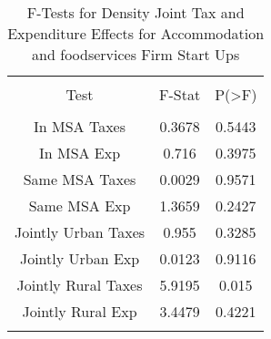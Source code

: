 
\begin{table}[!htbp] \centering 
  \caption{F-Tests for Density Joint Tax and Expenditure Effects for Accommodation and foodservices Firm Start Ups} 
  \label{72Ftests} 
\begin{tabular}{@{\extracolsep{5pt}} ccc} 
\\[-1.8ex]\hline 
\hline \\[-1.8ex] 
Test & F-Stat & P(\textgreater F) \\ 
\hline \\[-1.8ex] 
In MSA Taxes & 0.3678 & 0.5443 \\ 
In MSA Exp & 0.716 & 0.3975 \\ 
Same MSA Taxes & 0.0029 & 0.9571 \\ 
Same MSA Exp & 1.3659 & 0.2427 \\ 
Jointly Urban Taxes & 0.955 & 0.3285 \\ 
Jointly Urban Exp & 0.0123 & 0.9116 \\ 
Jointly Rural Taxes & 5.9195 & 0.015 \\ 
Jointly Rural Exp & 3.4479 & 0.4221 \\ 
\hline \\[-1.8ex] 
\end{tabular} 
\end{table} 
